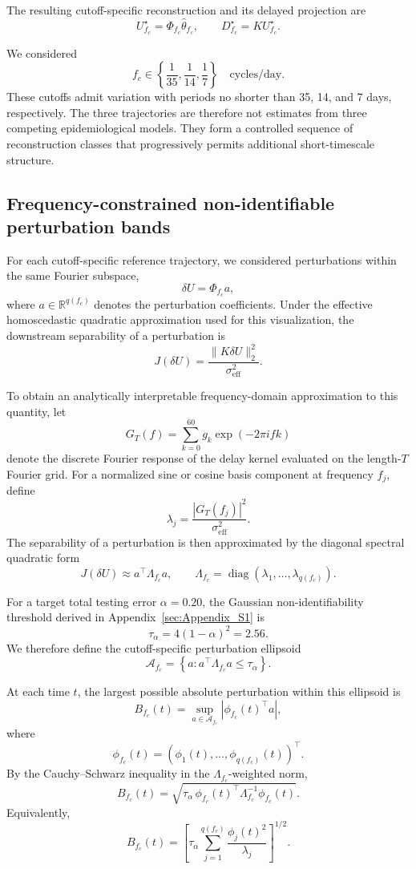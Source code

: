 The resulting cutoff-specific reconstruction and its delayed projection are
\[
U^\star_{f_c}
=
\Phi_{f_c}\widehat{\theta}_{f_c},
\qquad
D^\star_{f_c}
=
KU^\star_{f_c}.
\]

We considered
\[
f_c\in
\left\{
\frac{1}{35},
\frac{1}{14},
\frac{1}{7}
\right\}
\quad\text{cycles/day}.
\]
These cutoffs admit variation with periods no shorter than 35, 14, and 7 days,
respectively. The three trajectories are therefore not estimates from three
competing epidemiological models. They form a controlled sequence of
reconstruction classes that progressively permits additional short-timescale
structure.

\subsection{Frequency-constrained non-identifiable perturbation bands}
\label{sec:appendix_perturbation_bands}

For each cutoff-specific reference trajectory, we considered perturbations
within the same Fourier subspace,
\[
\delta U
=
\Phi_{f_c}a,
\]
where \(a\in\mathbb R^{q(f_c)}\) denotes the perturbation coefficients. Under
the effective homoscedastic quadratic approximation used for this
visualization, the downstream separability of a perturbation is
\[
J(\delta U)
=
\frac{\|K\delta U\|_2^2}
{\sigma_{\mathrm{eff}}^2}.
\]

To obtain an analytically interpretable frequency-domain approximation to this
quantity, let
\[
G_T(f)
=
\sum_{k=0}^{60}g_k
\exp(-2\pi i f k)
\]
denote the discrete Fourier response of the delay kernel evaluated on the
length-\(T\) Fourier grid. For a normalized sine or cosine basis component at
frequency \(f_j\), define
\[
\lambda_j
=
\frac{|G_T(f_j)|^2}
{\sigma_{\mathrm{eff}}^2}.
\]
The separability of a perturbation is then approximated by the diagonal
spectral quadratic form
\[
J(\delta U)
\approx
a^\top\Lambda_{f_c}a,
\qquad
\Lambda_{f_c}
=
\operatorname{diag}(\lambda_1,\ldots,\lambda_{q(f_c)}).
\]

For a target total testing error \(\alpha=0.20\), the Gaussian
non-identifiability threshold derived in
Appendix~\ref{sec:Appendix_S1} is
\[
\tau_\alpha
=
4(1-\alpha)^2
=
2.56.
\]
We therefore define the cutoff-specific perturbation ellipsoid
\[
\mathcal A_{f_c}
=
\left\{
a:
a^\top\Lambda_{f_c}a
\leq
\tau_\alpha
\right\}.
\]

At each time \(t\), the largest possible absolute perturbation within this
ellipsoid is
\[
B_{f_c}(t)
=
\sup_{a\in\mathcal A_{f_c}}
\left|
\phi_{f_c}(t)^\top a
\right|,
\]
where
\[
\phi_{f_c}(t)
=
\left(
\phi_1(t),\ldots,\phi_{q(f_c)}(t)
\right)^\top.
\]
By the Cauchy--Schwarz inequality in the
\(\Lambda_{f_c}\)-weighted norm,
\[
B_{f_c}(t)
=
\sqrt{
\tau_\alpha\,
\phi_{f_c}(t)^\top
\Lambda_{f_c}^{-1}
\phi_{f_c}(t)
}.
\]
Equivalently,
\[
B_{f_c}(t)
=
\left[
\tau_\alpha
\sum_{j=1}^{q(f_c)}
\frac{\phi_j(t)^2}{\lambda_j}
\right]^{1/2}.
\]


